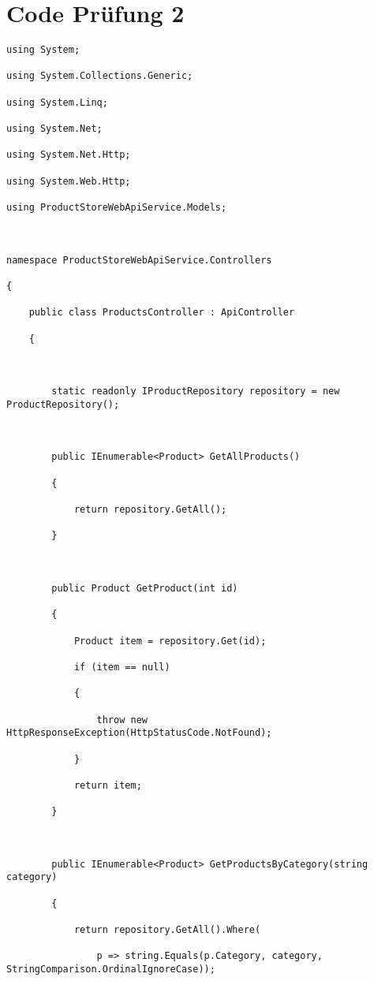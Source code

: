 \documentclass[a4paper,10pt]{scrreprt}
\begin{document}
\chapter{Code Prüfung 2}
\begin{lstlisting}[caption=WebApi Example]
 using System;

using System.Collections.Generic;

using System.Linq;

using System.Net;

using System.Net.Http;

using System.Web.Http;

using ProductStoreWebApiService.Models;



namespace ProductStoreWebApiService.Controllers

{

    public class ProductsController : ApiController

    {



        static readonly IProductRepository repository = new ProductRepository();



        public IEnumerable<Product> GetAllProducts()

        {

            return repository.GetAll();

        }



        public Product GetProduct(int id)

        {

            Product item = repository.Get(id);

            if (item == null)

            {

                throw new HttpResponseException(HttpStatusCode.NotFound);

            }

            return item;

        }



        public IEnumerable<Product> GetProductsByCategory(string category)

        {

            return repository.GetAll().Where(

                p => string.Equals(p.Category, category, StringComparison.OrdinalIgnoreCase));


\end{lstlisting}
\end{document}
